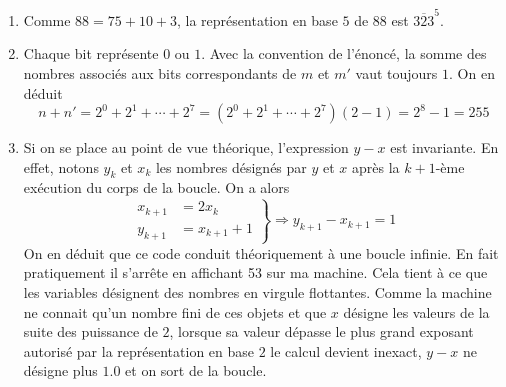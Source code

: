 \begin{enumerate}
  \item Comme $88 = 75 + 10 + 3$, la représentation en base $5$ de $88$ est $\overline{323}^5$.
  \item Chaque bit représente $0$ ou $1$. Avec la convention de l'énoncé, la somme des nombres associés aux bits correspondants de $m$ et $m'$ vaut toujours $1$. On en déduit
 \begin{displaymath}
   n+n' =  2^0 + 2^1+\cdots + 2^7 = (2^0 + 2^1+\cdots + 2^7)(2-1)=2^8 - 1 =255 
 \end{displaymath}

  \item Si on se place au point de vue théorique, l'expression $y-x$ est invariante. En effet, notons $y_k$ et $x_k$ les nombres désignés par $y$ et $x$ après la $k+1$-ème exécution du corps de la boucle. On a alors
\begin{displaymath}
\left. 
\begin{aligned}
x_{k+1} &= 2x_k\\ y_{k+1} &= x_{k+1} +1  
\end{aligned}
\right\rbrace  \Rightarrow
y_{k+1}-x_{k+1} =  1
\end{displaymath}
On en déduit que ce code conduit théoriquement à une boucle infinie. En fait pratiquement il s'arrête en affichant 53 sur ma machine. Cela tient à ce que les variables désignent des nombres en virgule flottantes. Comme la machine ne connait qu'un nombre fini de ces objets et que $x$ désigne les valeurs de la suite des puissance de $2$, lorsque sa valeur dépasse le plus grand exposant autorisé par la représentation en base $2$ le calcul devient inexact, $y-x$ ne désigne plus $1.0$ et on sort de la boucle.
\end{enumerate}
